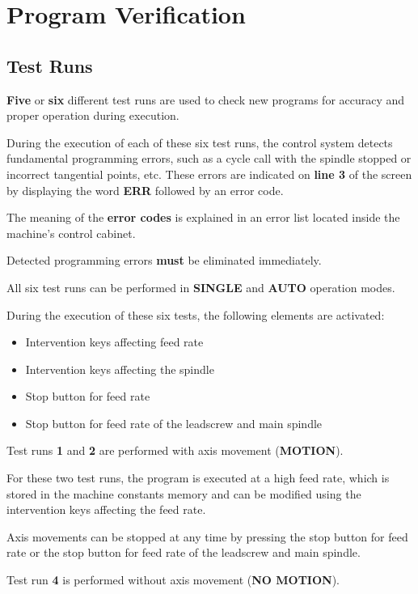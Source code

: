 \chapter{Program Verification}

\section{Test Runs}

\textbf{Five} or \textbf{six} different test runs are used to check new programs for accuracy and proper operation during execution.

During the execution of each of these six test runs, the control system detects fundamental programming errors, such as a cycle call with the spindle stopped or incorrect tangential points, etc.  
These errors are indicated on \textbf{line 3} of the screen by displaying the word \textbf{ERR} followed by an error code.

The meaning of the \textbf{error codes} is explained in an error list located inside the machine's control cabinet.

Detected programming errors \textbf{must} be eliminated immediately.

All six test runs can be performed in \textbf{SINGLE} and \textbf{AUTO} operation modes.

During the execution of these six tests, the following elements are activated:

\begin{itemize}
    \item Intervention keys affecting feed rate
    \item Intervention keys affecting the spindle
    \item Stop button for feed rate
    \item Stop button for feed rate of the leadscrew and main spindle
\end{itemize}

Test runs \textbf{1} and \textbf{2} are performed with axis movement (\textbf{MOTION}).

For these two test runs, the program is executed at a high feed rate, which is stored in the machine constants memory and can be modified using the intervention keys affecting the feed rate.

Axis movements can be stopped at any time by pressing the stop button for feed rate or the stop button for feed rate of the leadscrew and main spindle.

Test run \textbf{4} is performed without axis movement (\textbf{NO MOTION}).

